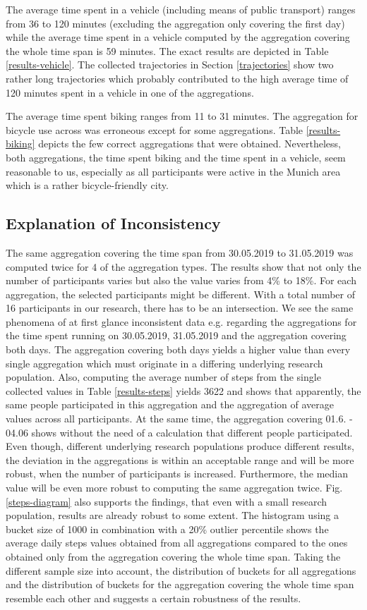 The average time spent in a vehicle (including means of public transport) ranges from 36 to 120 minutes (excluding the aggregation only covering the first day) while the average time spent in a vehicle computed by the aggregation covering the whole time span is 59 minutes. The exact results are depicted in Table \ref{results-vehicle}. The collected trajectories in Section \ref{trajectories} show two rather long trajectories which probably contributed to the high average time of 120 minutes spent in a vehicle in one of the aggregations.

The average time spent biking ranges from 11 to 31 minutes. The aggregation for bicycle use across was erroneous except for some aggregations. Table \ref{results-biking} depicts the few correct aggregations that were obtained. Nevertheless, both aggregations, the time spent biking and the time spent in a vehicle, seem reasonable to us, especially as all participants were active in the Munich area which is  a rather bicycle-friendly city.

\subsection{Explanation of Inconsistency}
The same aggregation covering the time span from 30.05.2019 to 31.05.2019 was computed twice for 4 of the aggregation types. The results show that not only the number of participants varies but also the value varies from 4\% to 18\%. For each aggregation, the selected participants might be different. With a total number of 16 participants in our research, there has to be an intersection. We see the same phenomena of at first glance inconsistent data e.g. regarding the aggregations for the time spent running on 30.05.2019, 31.05.2019 and the aggregation covering both days. The aggregation covering both days yields a higher value than every single aggregation which must originate in a differing underlying research population.
Also, computing the average number of steps from the single collected values in Table \ref{results-steps} yields 3622 and shows that apparently, the same people participated in this aggregation and the aggregation of average values across all participants. At the same time, the aggregation covering 01.6. - 04.06 shows without the need of a calculation that different people participated.
Even though, different underlying research populations produce different results, the deviation in the aggregations is within an acceptable range and will be more robust, when the number of participants is increased. Furthermore, the median value will be even more robust to computing the same aggregation twice.
Fig. \ref{steps-diagram} also supports the findings, that even with a small research population, results are already robust to some extent. The histogram using a bucket size of 1000 in combination with a 20\% outlier percentile shows the average daily steps values obtained from all aggregations compared to the ones obtained only from the aggregation covering the whole time span. Taking the different sample size into account, the distribution of buckets for all aggregations and the distribution of buckets for the aggregation covering the whole time span resemble each other and suggests a certain robustness of the results.

